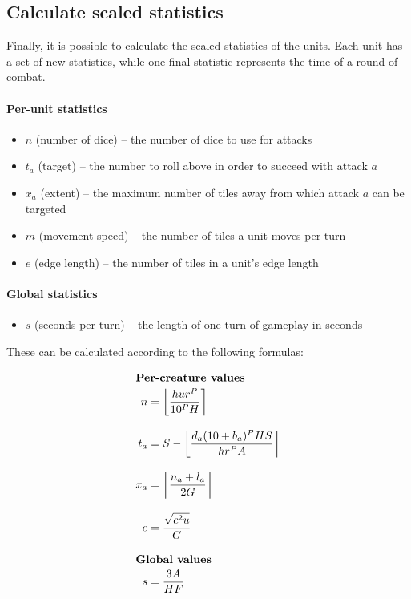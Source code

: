 \subsection{Calculate scaled statistics}\label{sec:calculate-scaled}

Finally, it is possible to calculate the scaled statistics of the units.
Each unit has a set of new statistics,
while one final statistic represents the time of a round of combat.

\paragraph{Per-unit statistics}
\begin{itemize}
    \item $n$ (number of dice) -- the number of dice to use for attacks
    \item $t_a$ (target) -- the number to roll above in order to succeed with attack $a$
    \item $x_a$ (extent) -- the maximum number of tiles away from which attack $a$ can be targeted
    \item $m$ (movement speed) -- the number of tiles a unit moves per turn
    \item $e$ (edge length) -- the number of tiles in a unit's edge length
\end{itemize}

\paragraph{Global statistics}
\begin{itemize}
    \item $s$ (seconds per turn) -- the length of one turn of gameplay in seconds
\end{itemize}

These can be calculated according to the following formulas:

\begin{align*}
\intertext{\textbf{Per-creature values}}
    n   &=
        \left\lfloor
            \frac
                {h u r^P}
                {10^P H}
        \right\rceil \\[2ex]
    t_a &=
        S -
        \left\lfloor
            \frac
                {d_a (10 + b_{a})^P H S}
                {h r^P A}
        \right\rceil \\[2ex]
    x_a &= \left\lceil\frac
        {n_a + l_a}
        {2 G}
        \right\rceil \\[2ex]
    e   &=
        \frac
            {\sqrt{c^2 u}}
            {G} \\[2ex]
\intertext{\textbf{Global values}}
    s   &=
        \frac
            {3 A}
            {H F}
\end{align*}